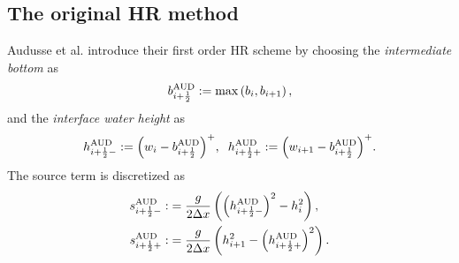 \documentclass[11pt,a4paper,center,notitlepage]{article}
\numberwithin{equation}{section}
\begin{document}
\subsection{The original HR method}
Audusse et al. \cite{Audusse2004} introduce their first order HR scheme by choosing the \textit{intermediate bottom} as 
\begin{align}
\label{3.6}
b_{i + \frac{1}{2}}^{\rm AUD}: = \max \left( {{b_i},{b_{i + 1}}} \right),
\end{align}
and the \textit{interface water height} as 
\begin{align}
\label{3.7}
h_{i + \frac{1}{2} - }^{\rm AUD}: = {\left( {{w_i} - b_{i + \frac{1}{2}}^{\rm AUD}} \right)^ + }, \hspace{2mm} h_{i + \frac{1}{2} + }^{\rm AUD}: = {\left( {{w_{i + 1}} - b_{i + \frac{1}{2}}^{\rm AUD}} \right)^ + }.
\end{align}
The source term is discretized as 
\begin{align}
s_{i + \frac{1}{2} - }^{\rm AUD}: &= \frac{g}{{2\Delta x}}\left( {{{\left( {h_{i + \frac{1}{2} - }^{\rm AUD}} \right)}^2} - h_i^2} \right),\\
s_{i + \frac{1}{2} + }^{\rm AUD}: &= \frac{g}{{2\Delta x}}\left( {h_{i + 1}^2 - {{\left( {h_{i + \frac{1}{2} + }^{\rm AUD}} \right)}^2}} \right).
\end{align}
\end{document}
